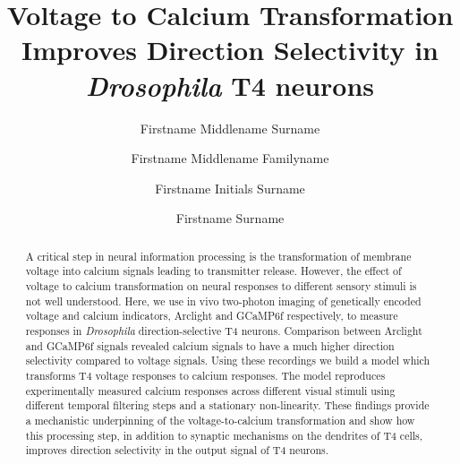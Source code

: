 \documentclass[9pt,lineno]{elife}
\title{Voltage to Calcium Transformation Improves Direction Selectivity in \textit{Drosophila} T4 neurons}
\author[1,2*]{Firstname Middlename Surname}
\author[1,2\authfn{1}\authfn{3}]{Firstname Middlename Familyname}
\author[2\authfn{1}\authfn{4}]{Firstname Initials Surname}
\author[2*]{Firstname Surname}
\affil[1]{Max Planck Institute for Biological Intelligence (in foundation), Martinsried, Germany}
\affil[2]{Graduate School of Systemic Neurosciences, LMU Munich, Martinsried, Germany}
\begin{document}
\maketitle

\begin{abstract}
A critical step in neural information processing is the transformation of membrane voltage into calcium signals leading to transmitter release. However, the effect of voltage to calcium transformation on neural responses to different sensory stimuli is not well understood. Here, we use in vivo two-photon imaging of genetically encoded voltage and calcium indicators, Arclight and GCaMP6f respectively, to measure responses in \textit{Drosophila} direction-selective T4 neurons. Comparison between Arclight and GCaMP6f signals revealed calcium signals to have a much higher direction selectivity compared to voltage signals. Using these recordings we build a model which transforms T4 voltage responses to calcium responses. The model reproduces experimentally measured calcium responses across different visual stimuli using different temporal filtering steps and a stationary non-linearity. These findings provide a mechanistic underpinning of the voltage-to-calcium transformation and show how this processing step, in addition to synaptic mechanisms on the dendrites of T4 cells, improves direction selectivity in the output signal of T4 neurons.


\end{abstract}
\end{document}
